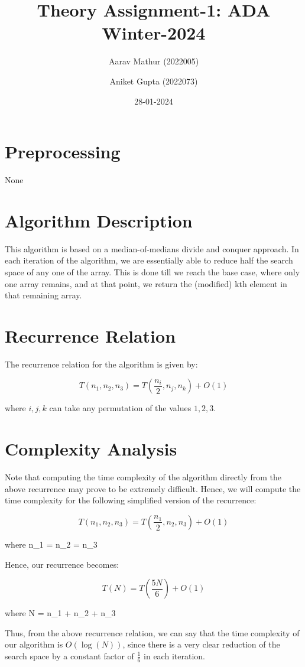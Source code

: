 \documentclass{article}
\title{Theory Assignment-1: ADA Winter-2024}
\author{Aarav Mathur (2022005) \and Aniket Gupta (2022073)}
\date{28-01-2024}
\begin{document}
\maketitle

\section{Preprocessing}
None

\section{Algorithm Description}
This algorithm is based on a median-of-medians divide and conquer approach. In each iteration of the algorithm, we are essentially able to reduce half the search space of any one of the array. This is done till we reach the base case, where only one array remains, and at that point, we return the (modified) kth element in that remaining array.

\section{Recurrence Relation}

The recurrence relation for the algorithm is given by:

\[
T(n_1, n_2, n_3) = T\left(\frac{n_i}{2}, n_j, n_k\right) + O(1)
\]

where \(i, j, k\) can take any permutation of the values \(1, 2, 3\).


\section{Complexity Analysis}
Note that computing the time complexity of the algorithm directly from the above recurrence may prove to be extremely difficult. Hence, we will compute the time complexity for the following simplified version of the recurrence:

\[
T(n_1, n_2, n_3) = T\left(\frac{n_1}{2}, n_2, n_3\right) + O(1)
\]

where n_1 = n_2 = n_3 \newline \newline

Hence, our recurrence becomes:

\[
T(N) = T(\frac{5N}{6}) + O(1) 
\]

where N = n_1 + n_2 + n_3 \newline

Thus, from the above recurrence relation, we can say that the time complexity of our algorithm is \(O(\log(N))\), since there is a very clear reduction of the search space by a constant factor of \(\frac{1}{6}\) in each iteration.
\end{document}
